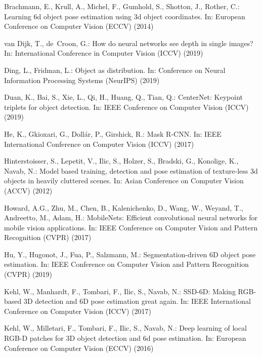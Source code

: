 \documentclass[runningheads]{llncs}
\begin{document}

\begin{thebibliography}{10}
\providecommand{\url}[1]{\texttt{#1}}
\providecommand{\urlprefix}{URL }
\providecommand{\doi}[1]{https://doi.org/#1}

Brachmann, E., Krull, A., Michel, F., Gumhold, S., Shotton, J., Rother, C.:
  Learning 6d object pose estimation using 3d object coordinates. In: European
  Conference on Computer Vision (ECCV) (2014)

van Dijk, T., de~Croon, G.: How do neural networks see depth in single images?
  In: International Conference in Computer Vision (ICCV) (2019)

Ding, L., Fridman, L.: Object as distribution. In: Conference on Neural
  Information Processing Systems (NeurIPS) (2019)

Duan, K., Bai, S., Xie, L., Qi, H., Huang, Q., Tian, Q.: {CenterNet}: Keypoint
  triplets for object detection. In: IEEE Conference on Computer Vision (ICCV)
  (2019)

He, K., Gkioxari, G., Doll\'{a}r, P., Girshick, R.: Mask {R-CNN}. In: IEEE
  International Conference on Computer Vision (ICCV) (2017)

Hinterstoisser, S., Lepetit, V., Ilic, S., Holzer, S., Bradski, G., Konolige,
  K., Navab, N.: Model based training, detection and pose estimation of
  texture-less 3d objects in heavily cluttered scenes. In: Asian Conference on
  Computer Vision (ACCV) (2012)

Howard, A.G., Zhu, M., Chen, B., Kalenichenko, D., Wang, W., Weyand, T.,
  Andreetto, M., Adam, H.: {MobileNets}: Efficient convolutional neural
  networks for mobile vision applications. In: IEEE Conference on Computer
  Vision and Pattern Recognition (CVPR) (2017)

Hu, Y., Hugonot, J., Fua, P., Salzmann, M.: Segmentation-driven {6D} object
  pose estimation. In: IEEE Conference on Computer Vision and Pattern
  Recognition (CVPR) (2019)

Kehl, W., Manhardt, F., Tombari, F., Ilic, S., Navab, N.: {SSD-6D}: Making
  {RGB}-based {3D} detection and {6D} pose estimation great again. In: IEEE
  International Conference on Computer Vision (ICCV) (2017)

Kehl, W., Milletari, F., Tombari, F., Ilic, S., Navab, N.: Deep learning of
  local {RGB-D} patches for {3D} object detection and 6d pose estimation. In:
  European Conference on Computer Vision (ECCV) (2016)


\end{thebibliography}
\end{document}

